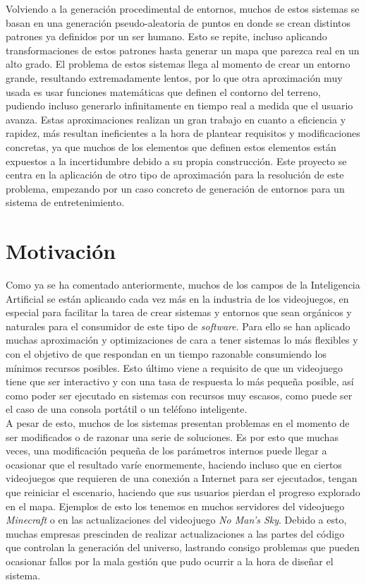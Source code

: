 Volviendo a la generación procedimental de entornos, muchos de estos sistemas se basan en una generación pseudo-aleatoria de puntos en donde se crean distintos patrones ya definidos por un ser humano. Esto se repite, incluso aplicando transformaciones de estos patrones hasta generar un mapa que parezca real en un alto grado. El problema de estos sistemas llega al momento de crear un entorno grande, resultando extremadamente lentos, por lo que otra aproximación muy usada es usar funciones matemáticas que definen el contorno del terreno, pudiendo incluso generarlo infinitamente en tiempo real a medida que el usuario avanza. Estas aproximaciones realizan un gran trabajo en cuanto a eficiencia y rapidez, más resultan ineficientes a la hora de plantear requisitos y modificaciones concretas, ya que muchos de los elementos que definen estos elementos están expuestos a la incertidumbre debido a su propia construcción. Este proyecto se centra en la aplicación de otro tipo de aproximación para la resolución de este problema, empezando por un caso concreto de generación de entornos para un sistema de entretenimiento.

\section{Motivación}

Como ya se ha comentado anteriormente, muchos de los campos de la Inteligencia Artificial se están aplicando cada vez más en la industria de los videojuegos, en especial para facilitar la tarea de crear sistemas y entornos que sean orgánicos y naturales para el consumidor de este tipo de \textit{software}. Para ello se han aplicado muchas aproximación y optimizaciones de cara a tener sistemas lo más flexibles y con el objetivo de que respondan en un tiempo razonable consumiendo los mínimos recursos posibles. Esto último viene a requisito de que un videojuego tiene que ser interactivo y con una tasa de respuesta lo más pequeña posible, así como poder ser ejecutado en sistemas con recursos muy escasos, como puede ser el caso de una consola portátil o un teléfono inteligente. \\

A pesar de esto, muchos de los sistemas presentan problemas en el momento de ser modificados o de razonar una serie de soluciones. Es por esto que muchas veces, una modificación pequeña de los parámetros internos puede llegar a ocasionar que el resultado varíe enormemente, haciendo incluso que en ciertos videojuegos que requieren de una conexión a Internet para ser ejecutados, tengan que reiniciar el escenario, haciendo que sus usuarios pierdan el progreso explorado en el mapa. Ejemplos de esto los tenemos en muchos servidores del videojuego \textit{Minecraft} o en las actualizaciones del videojuego \textit{No Man's Sky}. Debido a esto, muchas empresas prescinden de realizar actualizaciones a las partes del código que controlan la generación del universo, lastrando consigo problemas que pueden ocasionar fallos por la mala gestión que pudo ocurrir a la hora de diseñar el sistema. \\

